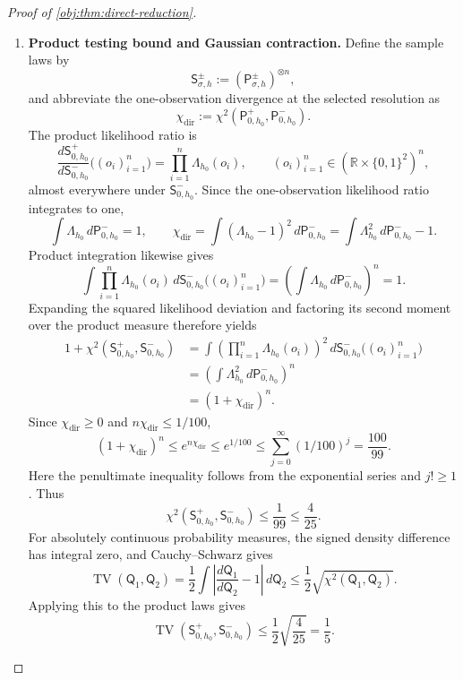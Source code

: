 \begin{proof}[Proof of \cref{obj:thm:direct-reduction}]
\begin{enumerate}
\item \textbf{Product testing bound and Gaussian contraction.}
Define the sample laws by
\[
\mathsf S_{\sigma,h}^{\pm}
:=(\mathsf P_{\sigma,h}^{\pm})^{\otimes n},
\]
and abbreviate the one-observation divergence at the selected resolution as
\[
\chi_{\mathrm{dir}}
:=\chi^2(\mathsf P_{0,h_0}^+,\mathsf P_{0,h_0}^-).
\]
The product likelihood ratio is
\[
\frac{d\mathsf S_{0,h_0}^+}{d\mathsf S_{0,h_0}^-}
\bigl((o_i)_{i=1}^n\bigr)
=\prod_{i=1}^n\Lambda_{h_0}(o_i),
\qquad
(o_i)_{i=1}^n\in(\mathbb R\times\{0,1\}^2)^n,
\]
almost everywhere under \(\mathsf S_{0,h_0}^-\). Since the one-observation likelihood ratio integrates to one,
\[
\int\Lambda_{h_0}\,d\mathsf P_{0,h_0}^-=1,
\qquad
\chi_{\mathrm{dir}}
=\int(\Lambda_{h_0}-1)^2\,d\mathsf P_{0,h_0}^-
=\int\Lambda_{h_0}^2\,d\mathsf P_{0,h_0}^- -1.
\]
Product integration likewise gives
\[
\int\prod_{i=1}^n\Lambda_{h_0}(o_i)
\,d\mathsf S_{0,h_0}^-\bigl((o_i)_{i=1}^n\bigr)
=\left(\int\Lambda_{h_0}\,d\mathsf P_{0,h_0}^-\right)^n
=1.
\]
Expanding the squared likelihood deviation and factoring its second moment over the product measure therefore yields
\[
\begin{aligned}
1+\chi^2(\mathsf S_{0,h_0}^+,\mathsf S_{0,h_0}^-)
&=\int\left(\prod_{i=1}^n\Lambda_{h_0}(o_i)\right)^2
\,d\mathsf S_{0,h_0}^-\bigl((o_i)_{i=1}^n\bigr)\\
&=\left(\int\Lambda_{h_0}^2\,d\mathsf P_{0,h_0}^-\right)^n\\
&=(1+\chi_{\mathrm{dir}})^n.
\end{aligned}
\]
Since \(\chi_{\mathrm{dir}}\ge0\) and \(n\chi_{\mathrm{dir}}\le1/100\),
\[
(1+\chi_{\mathrm{dir}})^n
\le e^{n\chi_{\mathrm{dir}}}
\le e^{1/100}
\le\sum_{j=0}^\infty(1/100)^j
=\frac{100}{99}.
\]
Here the penultimate inequality follows from the exponential series and \(j!\ge1\). Thus
\[
\chi^2(\mathsf S_{0,h_0}^+,\mathsf S_{0,h_0}^-)
\le\frac1{99}\le\frac4{25}.
\]
For absolutely continuous probability measures, the signed density difference has integral zero, and Cauchy--Schwarz gives
\[
\operatorname{TV}(\mathsf Q_1,\mathsf Q_2)
=\frac12\int
\left|\frac{d\mathsf Q_1}{d\mathsf Q_2}-1\right|
\,d\mathsf Q_2
\le\frac12\sqrt{\chi^2(\mathsf Q_1,\mathsf Q_2)}.
\]
Applying this to the product laws gives
\[
\operatorname{TV}(\mathsf S_{0,h_0}^+,\mathsf S_{0,h_0}^-)
\le\frac12\sqrt{\frac4{25}}=\frac15.
\]


\end{enumerate}
\end{proof}
